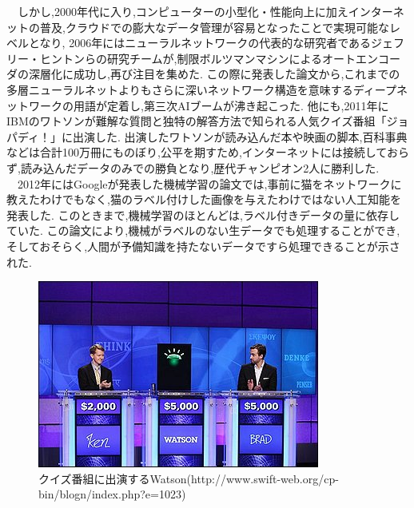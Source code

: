 　しかし,2000年代に入り,コンピューターの小型化・性能向上に加えインターネットの普及,クラウドでの膨大なデータ管理が容易となったことで実現可能なレベルとなり,
2006年にはニューラルネットワークの代表的な研究者であるジェフリー・ヒントンらの研究チームが,制限ボルツマンマシンによるオートエンコーダの深層化に成功し,再び注目を集めた.
この際に発表した論文から,これまでの多層ニューラルネットよりもさらに深いネットワーク構造を意味するディープネットワークの用語が定着し,第三次AIブームが沸き起こった.
他にも,2011年にIBMのワトソンが難解な質問と独特の解答方法で知られる人気クイズ番組「ジョパディ！」に出演した.\cite{webpage6}
出演したワトソンが読み込んだ本や映画の脚本,百科事典などは合計100万冊にものぼり,公平を期すため,インターネットには接続しておらず,読み込んだデータのみでの勝負となり,歴代チャンピオン2人に勝利した.\\
　2012年にはGoogleが発表した機械学習の論文では,事前に猫をネットワークに教えたわけでもなく,猫のラベル付けした画像を与えたわけではない人工知能を発表した.\cite{ronbun3}
このときまで,機械学習のほとんどは,ラベル付きデータの量に依存していた.
この論文により,機械がラベルのない生データでも処理することができ,そしておそらく,人間が予備知識を持たないデータですら処理できることが示された.
\begin{figure}[!ht]
    \begin{screen}
    \begin{center}
        \includegraphics[scale=1.1, clip]{./img/Watson.jpg}
        \caption{クイズ番組に出演するWatson\newline(http://www.swift-web.org/cp-bin/blogn/index.php?e=1023)}
        \label{fig:クイズ番組に出演するWatson}
    \end{center}
\end{screen}
\end{figure}\\
\newpage
